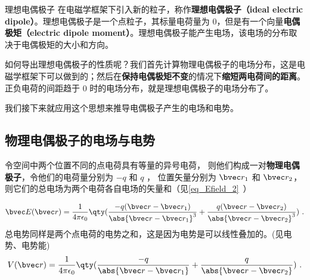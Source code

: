 \begin{definition}{理想电偶极子}
在电磁学框架下引入新的粒子，称作\textbf{理想电偶极子（ideal electric dipole）}。理想电偶极子是一个点粒子，其标量电荷量为 $0$，但是有一个向量\textbf{电偶极矩（electric dipole moment）}。理想电偶极子能产生电场，该电场的分布取决于电偶极矩的大小和方向。
\end{definition}


如何导出理想电偶极子的性质呢？我们首先计算物理电偶极子的电场分布，这是电磁学框架下可以做到的；然后在\textbf{保持电偶极矩不变}的情况下\textbf{缩短两电荷间的距离}。正负电荷的间距趋于 $0$ 时的电场分布，就是理想电偶极子的电场分布了。

我们接下来就应用这个思想来推导电偶极子产生的电场和电势。


\subsection{物理电偶极子的电场与电势}

令空间中两个位置不同的点电荷具有等量的异号电荷， 则他们构成一对\textbf{物理电偶极子}，令他们的电荷量分别为 $-q$ 和 $q$ ， 位置矢量分别为 $\bvec r_1$ 和 $\bvec r_2$， 则它们的总电场为两个电荷各自电场的矢量和（见\autoref{eq_Efield_2}~）

\begin{equation}
\bvec E(\bvec r) = \frac{1}{4\pi\epsilon_0} \qty(\frac{-q(\bvec r - \bvec r_1)}{\abs{\bvec r - \bvec r_1}^3} + \frac{q(\bvec r - \bvec r_2)}{\abs{\bvec r - \bvec r_2}^3})~.
\end{equation}
总电势同样是两个点电荷的电势之和，这是因为电势是可以线性叠加的。(见电势、电势能)
\begin{equation}\label{eq_eleDpl_4}
V(\bvec r) = \frac{1}{4\pi\epsilon_0} \qty(\frac{-q}{\abs{\bvec r - \bvec r_1}} + \frac{q}{\abs{\bvec r - \bvec r_2}})~.
\end{equation}


